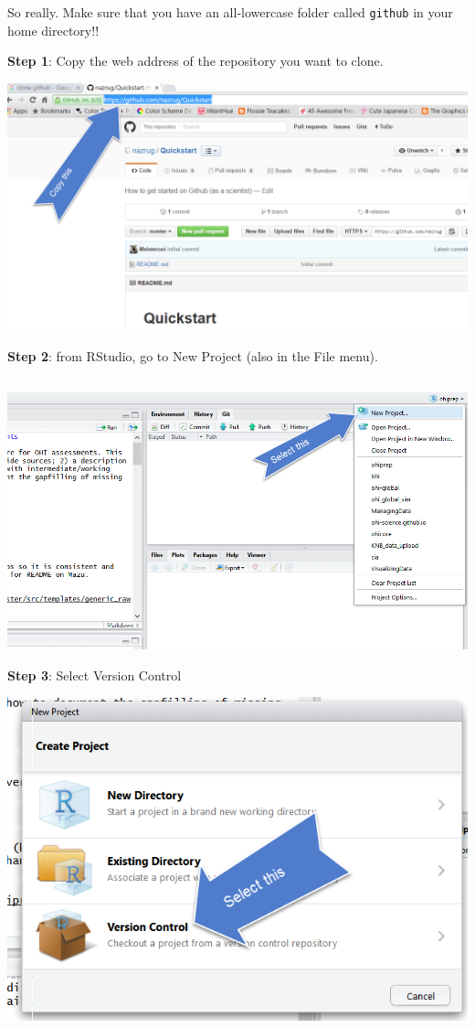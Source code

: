 \documentclass[]{book}
\begin{document}
So really. Make sure that you have an all-lowercase folder called \texttt{github} in your home directory!!

\textbf{Step 1}: Copy the web address of the repository you want to clone.

\includegraphics{img/clone_step1.png}

\textbf{Step 2}: from RStudio, go to New Project (also in the File menu).

\includegraphics{img/new_project_1.png}

\textbf{Step 3}: Select Version Control

\includegraphics{img/new_project_2.png}
\end{document}
